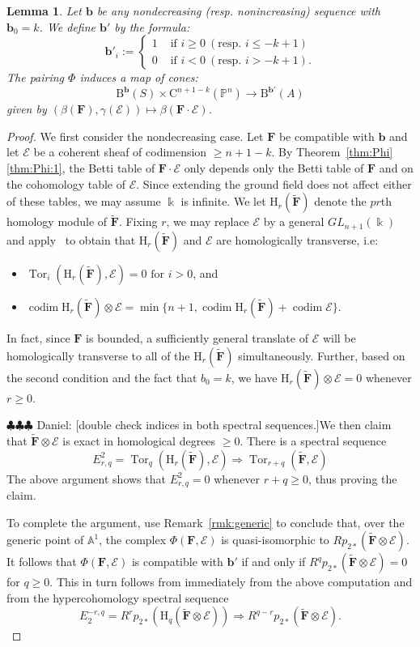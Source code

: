 \documentclass[12pt]{amsart}
\newtheorem{lemma}{Lemma}[section]
\theoremstyle{definition}
\theoremstyle{remark}
\newcommand{\Tor}{\operatorname{Tor}}
\newcommand{\kk}{\Bbbk}
\newcommand{\codim}{\operatorname{codim}}
\newcommand{\PP}{\mathbb{P}}
\renewcommand{\AA}{\mathbb{A}}
\newcommand{\HH}{\mathrm{H}}
\newcommand{\bb}{\mathbf{b}}
\newcommand{\cE}{\mathcal{E}}
\newcommand{\FF}{\mathbf{F}}
\newcommand{\GL}{{GL}}
\newcommand{\CQ}{\mathrm{C}}
\newcommand{\BBQ}{\mathrm{B}}
\newcommand{\daniel}[1]{{\color{green} \sf $\clubsuit\clubsuit\clubsuit$ Daniel: [#1]}}
\begin{document}
\begin{lemma}\label{lem:refined positivity}
Let $\bb$ be any nondecreasing (resp. nonincreasing) sequence with $\bb_0=k$.   We define $\bb'$ by the formula:
\[
\bb'_i:=\begin{cases}
1&\text{ if } i\geq 0 \ (\text{resp. } i\leq -k+1)\\
0&\text{ if } i<0  \ (\text{resp. } i> -k+1).
\end{cases}
\]
The  pairing $\Phi$ induces a map of cones:
\[
\BBQ^{\bb}(S)\times \CQ^{n+1-k}(\PP^n)\to \BBQ^{\bb'}(A)
\]
given by $(\beta(\FF), \gamma(\cE))\mapsto \beta(\FF\cdot \cE)$.
\end{lemma}
\begin{proof}
We first consider the nondecreasing case.  Let $\FF$ be compatible with $\bb$ and let $\cE$ be a coherent sheaf of codimension $\geq n+1-k$.  By Theorem~\ref{thm:Phi}\eqref{thm:Phi:1}, the Betti table of $\FF\cdot \cE$ only depends only the Betti table of $\FF$ and on the cohomology table of $\cE$.  Since extending the ground field does not affect either of these tables, we may assume $\kk$ is infinite.  We let $\HH_r(\widetilde{\FF})$ denote the $pr$th homology module of $\widetilde{\FF}$.  Fixing $r$, we may replace $\cE$ by a general $\GL_{n+1}(\kk)$ and apply~\cite[Theorem]{miller-speyer} to obtain that $\HH_r(\widetilde{\FF})$ and $\cE$ are homologically transverse, i.e:
\begin{itemize}
	\item $\Tor_i(\HH_r(\widetilde{\FF}),\cE)=0 \text{ for } i>0$, and
	\item $\codim \HH_r(\widetilde{\FF})\otimes \cE= \min\{n+1, \codim \HH_r(\widetilde{\FF})+\codim \cE\}.$
\end{itemize}
In fact, since $\FF$ is bounded, a sufficiently general translate of $\cE$ will be homologically transverse to all of the $\HH_r(\widetilde{\FF})$ simultaneously.  Further, based on the second condition and the fact that $b_0=k$, we have $\HH_r(\widetilde{\FF})\otimes \cE=0$ whenever $r\geq 0$.

\daniel{double check indices in both spectral sequences.}We then claim that $\widetilde{\FF}\otimes \cE$ is exact in homological degrees $\geq 0$.  There is a spectral sequence
\[
E^2_{r,q}=\Tor_q(\HH_r(\widetilde{\FF}),\cE)\Rightarrow \Tor_{r+q}(\widetilde{\FF},\cE)
\]
The above argument shows that $E^2_{r,q}=0$ whenever $r+q\geq 0$, thus proving the claim.

To complete the argument, use Remark~\ref{rmk:generic} to conclude that, over the generic point of $\AA^1$, the complex $\Phi(\FF,\cE)$ is quasi-isomorphic to $Rp_{2*}\left(\widetilde{\FF}\otimes \cE\right)$.  It follows that $\Phi(\FF,\cE)$ is compatible with $\bb'$ if and only if $R^qp_{2*}\left(\widetilde{\FF}\otimes \cE\right)=0$ for $q\geq 0$.  This in turn follows from immediately from the above computation and from the hypercohomology spectral sequence
\[
E_2^{-r,q}=R^rp_{2*}(\HH_q(\widetilde{\FF}\otimes \cE))\Rightarrow R^{q-r}p_{2*}(\widetilde{\FF}\otimes \cE).
\]



\end{proof}
\end{document}
